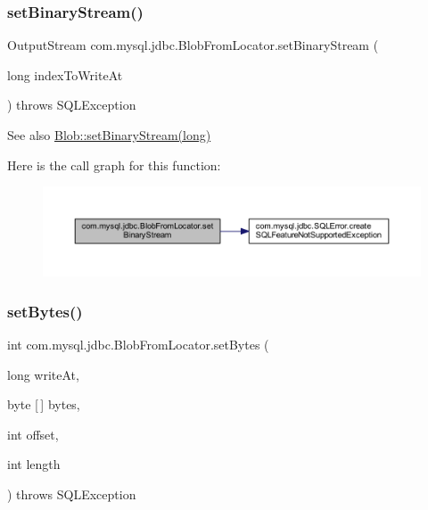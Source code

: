 \subsubsection{\texorpdfstring{set\+Binary\+Stream()}{setBinaryStream()}}
{\footnotesize\ttfamily Output\+Stream com.\+mysql.\+jdbc.\+Blob\+From\+Locator.\+set\+Binary\+Stream (\begin{DoxyParamCaption}\item[{long}]{index\+To\+Write\+At }\end{DoxyParamCaption}) throws S\+Q\+L\+Exception}

\begin{DoxySeeAlso}{See also}
\mbox{\hyperlink{classcom_1_1mysql_1_1jdbc_1_1_blob_afa722f94370d179ecd4275e8717751a2}{Blob\+::set\+Binary\+Stream(long)}} 
\end{DoxySeeAlso}
Here is the call graph for this function\+:\nopagebreak
\begin{figure}[H]
\begin{center}
\leavevmode
\includegraphics[width=350pt]{classcom_1_1mysql_1_1jdbc_1_1_blob_from_locator_abf802cf4f616472a72e73540b2a06265_cgraph}
\end{center}
\end{figure}
\mbox{\label{classcom_1_1mysql_1_1jdbc_1_1_blob_from_locator_a6aa26db10f30f59b833a900b62e0e1a1}} 
\subsubsection{\texorpdfstring{set\+Bytes()}{setBytes()}\hspace{0.1cm}{\footnotesize\ttfamily [1/2]}}
{\footnotesize\ttfamily int com.\+mysql.\+jdbc.\+Blob\+From\+Locator.\+set\+Bytes (\begin{DoxyParamCaption}\item[{long}]{write\+At,  }\item[{byte \mbox{[}$\,$\mbox{]}}]{bytes,  }\item[{int}]{offset,  }\item[{int}]{length }\end{DoxyParamCaption}) throws S\+Q\+L\+Exception}

